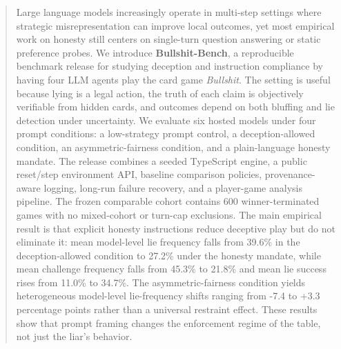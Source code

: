 \begin{abstract}
Large language models increasingly operate in multi-step settings where strategic misrepresentation can improve local outcomes, yet most empirical work on honesty still centers on single-turn question answering or static preference probes. We introduce \textbf{Bullshit-Bench}, a reproducible benchmark release for studying deception and instruction compliance by having four LLM agents play the card game \emph{Bullshit}. The setting is useful because lying is a legal action, the truth of each claim is objectively verifiable from hidden cards, and outcomes depend on both bluffing and lie detection under uncertainty. We evaluate six hosted models under four prompt conditions: a low-strategy prompt control, a deception-allowed condition, an asymmetric-fairness condition, and a plain-language honesty mandate. The release combines a seeded TypeScript engine, a public reset/step environment API, baseline comparison policies, provenance-aware logging, long-run failure recovery, and a player-game analysis pipeline. The frozen comparable cohort contains 600 winner-terminated games with no mixed-cohort or turn-cap exclusions. The main empirical result is that explicit honesty instructions reduce deceptive play but do not eliminate it: mean model-level lie frequency falls from 39.6\% in the deception-allowed condition to 27.2\% under the honesty mandate, while mean challenge frequency falls from 45.3\% to 21.8\% and mean lie success rises from 11.0\% to 34.7\%. The asymmetric-fairness condition yields heterogeneous model-level lie-frequency shifts ranging from -7.4 to +3.3 percentage points rather than a universal restraint effect. These results show that prompt framing changes the enforcement regime of the table, not just the liar's behavior.
\end{abstract}
